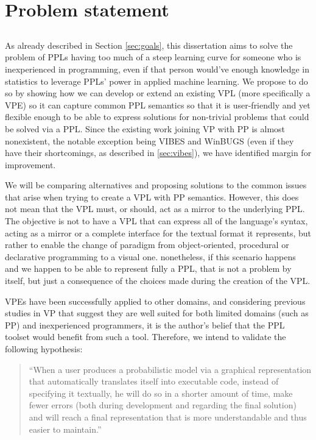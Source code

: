 \chapter{Problem statement}\label{chap:chap3}

\section*{}

As already described in Section \ref{sec:goals}, this dissertation aims to solve
the problem of PPLs having too much of a steep learning curve for someone who
is inexperienced in programming, even if that person would've enough knowledge
in statistics to leverage PPLs' power in applied machine learning. We propose
to do so by showing how we can develop or extend an existing VPL (more specifically
a VPE) so it can capture common PPL semantics so that it is user-friendly
and yet flexible enough to be able to express solutions for non-trivial problems
that could be solved via a PPL. Since the existing work joining VP with PP is almost nonexistent, the notable exception
being VIBES and WinBUGS (even if they have their shortcomings, as described in \ref{sec:vibes}),
we have identified margin for improvement.

We will be comparing alternatives and proposing solutions to the common issues that
arise when trying to create a VPL with PP semantics. However, this does not mean that
the VPL must, or should, act as a mirror to the underlying PPL. The objective
is not to have a VPL that can express all of the language's syntax, acting as
a mirror or a complete interface for the textual format it represents, but rather
to enable the change of paradigm from object-oriented, procedural or declarative programming
to a visual one. nonetheless, if this scenario happens and we happen to be able
to represent fully a PPL, that is not a problem by itself, but just a consequence
of the choices made during the creation of the VPL.

VPEs have been successfully applied to other domains, and considering previous studies in VP that suggest they
are well suited for both limited domains (such as PP) and inexperienced programmers, it is the
author's belief that the PPL toolset would benefit from such a tool.
Therefore, we intend to validate the following hypothesis:

\begin{quote}
  ``When a user produces a probabilistic model via a graphical representation that automatically translates
  itself into executable code, instead of specifying it textually,
  he will do so in a shorter amount of time, make
  fewer errors (both during development and regarding the final solution) and
  will reach a final representation that is more understandable and thus
  easier to maintain.''
\end{quote}

